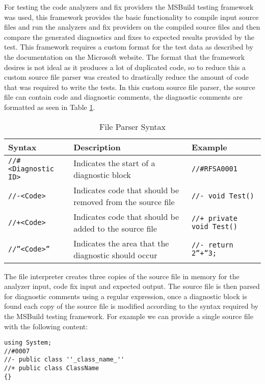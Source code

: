 For testing the code analyzers and fix providers the MSBuild testing framework was used, this framework provides the basic functionality to compile input source files and run the analyzers and fix providers on the compiled source files and then compare the generated diagnostics and fixes to expected results provided by the test.
This framework requires a custom format for the test data as described by the documentation on the Microsoft website. The format that the framework desires is not ideal as it produces a lot of duplicated code, so to reduce this a custom source file parser was created to drastically reduce the amount of code that was required to write the tests. In this custom source file parser, the source file can contain code and diagnostic comments, the diagnostic comments are formatted as seen in Table \ref{tab:FileParserSyntax}.
\begin{table}[H]
    \centering
    \caption{File Parser Syntax}
    \label{tab:FileParserSyntax}
    \begin{tabular}{|p{3.5cm}|p{8cm}|p{4cm}|}
        \hline
        Syntax&Description&Example\\
        \hline
        \texttt{//\#\textless Diagnostic ID\textgreater}&Indicates the start of a diagnostic block&\texttt{//\#RFSA0001}\\
        \texttt{//-\textless Code\textgreater}&Indicates code that should be removed from the source file&\texttt{//- void Test()}\\
        \texttt{//+\textless Code\textgreater}&Indicates code that should be added to the source file&\texttt{//+ private void Test()}\\
        \texttt{//''\textless Code\textgreater''}&Indicates the area that the diagnostic should occur&\texttt{//- return 2''+''3; }\\
        \hline
    \end{tabular}
\end{table}

The file interpreter creates three copies of the source file in memory for the analyzer input, code fix input and expected output. The source file is then parsed for diagnostic comments using a regular expression, once a diagnostic block is found each copy of the source file is modified according to the syntax required by the MSBuild testing framework.
For example we can provide a single source file with the following content:
\begin{lstlisting}[style=sharpc]
using System;
//#0007
//- public class ''_class_name_''
//+ public class ClassName
{}
\end{lstlisting}

